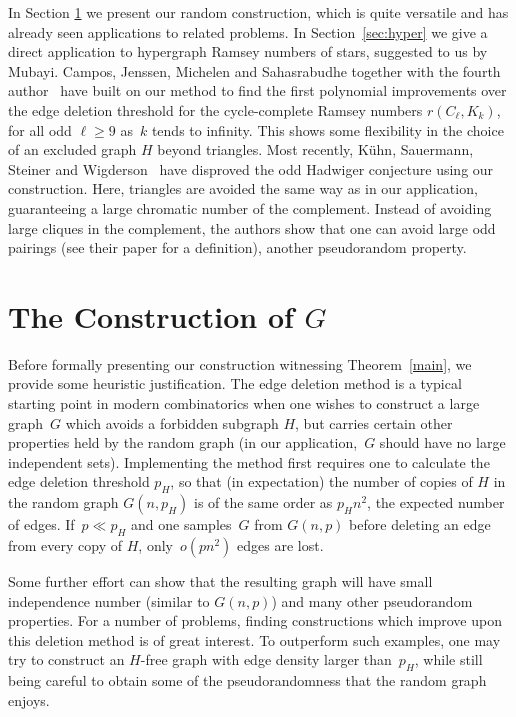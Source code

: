 \documentclass{article}
\begin{document}
In Section \ref{sec:construction} we present our random construction, which is quite versatile and has already seen applications to related problems. In Section~\ref{sec:hyper} we  give a direct application to hypergraph Ramsey numbers of stars, suggested to us by Mubayi.  Campos, Jenssen, Michelen and Sahasrabudhe together with the fourth author~\cite{campos2025polynomialimprovementoddcyclecomplete} have built on our method to find the first polynomial improvements over the edge deletion threshold 
for the cycle-complete Ramsey numbers $r(C_{\ell},K_k)$, for all odd $\ell\ge 9$ as~$k$ tends to infinity. This shows some flexibility in the choice of an excluded graph $H$ beyond triangles.
Most recently,
K\"uhn, Sauermann, Steiner and Wigderson~\cite{kühn2025disproofoddhadwigerconjecture} have disproved the odd Hadwiger conjecture using our construction. Here, triangles are avoided the same way as in our application, guaranteeing a large chromatic number of the complement. Instead of avoiding large cliques in the complement, the authors show that one can avoid large odd pairings (see their paper for a definition), another pseudorandom property. 



\section{The Construction of $G$}\label{sec:construction}


Before formally presenting our construction witnessing Theorem~\ref{main}, we provide some heuristic justification. 
The edge deletion method is a typical starting point in modern combinatorics when one wishes to construct a large graph~$G$ which avoids a forbidden subgraph $H$, but carries certain other properties held by the random graph (in our application,~$G$ should have no large independent sets).
Implementing the method first requires one  to calculate the edge deletion threshold $p_H$, so that (in expectation) the number of copies of $H$ in the random graph $G(n,p_H)$ is of the same order as $p_Hn^2$, the expected number of edges. If~$p\ll p_H$ and one samples~$G$ from $G(n,p)$ before deleting an edge from every copy of $H$, only~$o(pn^2)$ edges are lost.

Some further effort can show that the resulting graph will have small independence number (similar to $G(n,p)$) and many other pseudorandom properties.
For a number of problems, finding constructions which improve upon this deletion method is of great interest.
To outperform such examples, one may try to construct an $H$-free graph with edge density larger than~$p_H$, while still being careful to obtain some of the pseudorandomness that the random graph enjoys.
\end{document}
